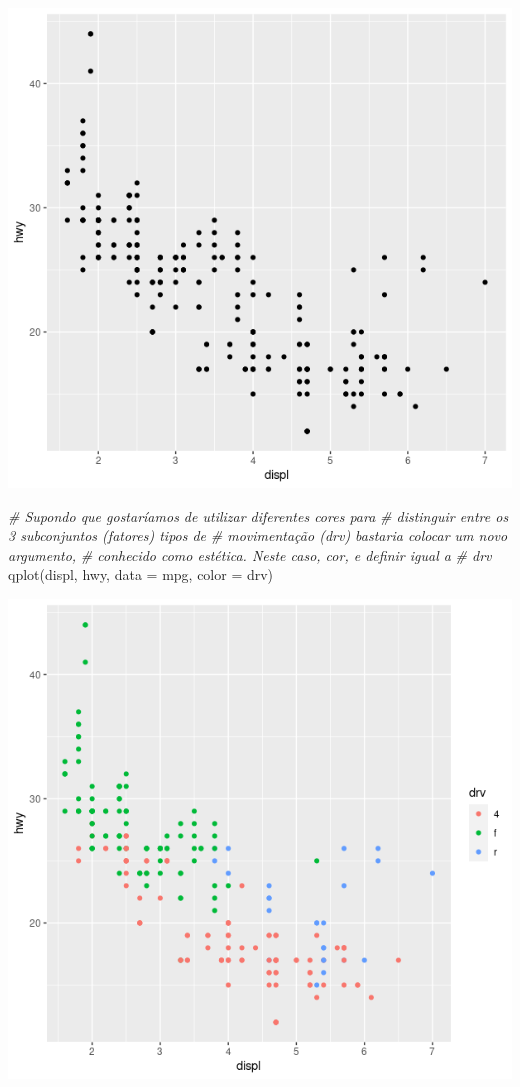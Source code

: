\documentclass[
]{book}
\newenvironment{Shaded}{\begin{snugshade}}{\end{snugshade}}
\newcommand{\AttributeTok}[1]{\textcolor[rgb]{0.77,0.63,0.00}{#1}}
\newcommand{\CommentTok}[1]{\textcolor[rgb]{0.56,0.35,0.01}{\textit{#1}}}
\newcommand{\FunctionTok}[1]{\textcolor[rgb]{0.00,0.00,0.00}{#1}}
\newcommand{\NormalTok}[1]{#1}
\begin{document}
\includegraphics{figure/g12.png}

\begin{Shaded}
\begin{Highlighting}[]
\CommentTok{\# Supondo que gostaríamos de utilizar diferentes cores para}
\CommentTok{\# distinguir entre os 3 subconjuntos (fatores) tipos de}
\CommentTok{\# movimentação (drv) bastaria colocar um novo argumento,}
\CommentTok{\# conhecido como estética. Neste caso, cor, e definir igual a}
\CommentTok{\# drv}
\FunctionTok{qplot}\NormalTok{(displ, hwy, }\AttributeTok{data =}\NormalTok{ mpg, }\AttributeTok{color =}\NormalTok{ drv)}
\end{Highlighting}
\end{Shaded}

\includegraphics{figure/g13.png}
\end{document}
